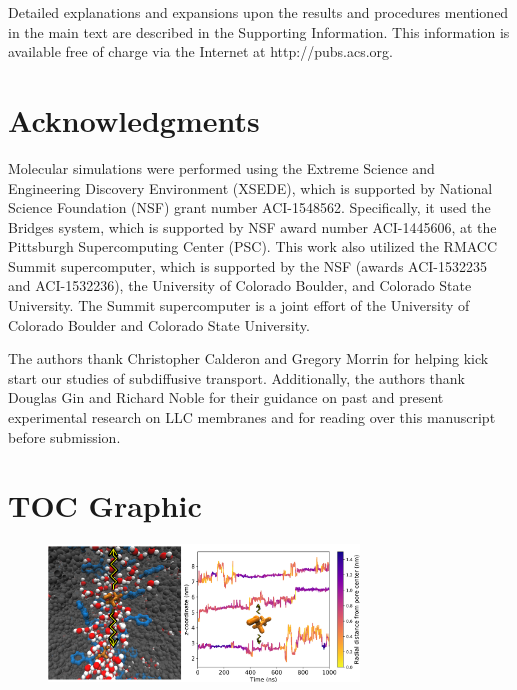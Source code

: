 \documentclass[journal=jpcbfk,manuscript=article]{achemso}
\begin{document}
  Detailed explanations and expansions upon the results and procedures mentioned in
  the main text are described in the Supporting Information. This information is
  available free of charge via the Internet at http://pubs.acs.org.

  \section*{Acknowledgments}

  Molecular simulations were performed using the Extreme Science and
  Engineering Discovery Environment (XSEDE), which is supported by National
  Science Foundation (NSF) grant number ACI-1548562. Specifically, it used the Bridges
  system, which is supported by NSF award number ACI-1445606, at the Pittsburgh
  Supercomputing Center (PSC). This work also utilized the RMACC Summit supercomputer,
  which is supported by the NSF (awards ACI-1532235 and
  ACI-1532236), the University of Colorado Boulder, and Colorado State
  University. The Summit supercomputer is a joint effort of the University of
  Colorado Boulder and Colorado State University.
  
  The authors thank Christopher Calderon and Gregory Morrin for helping kick start
  our studies of subdiffusive transport. Additionally, the authors thank 
  Douglas Gin and Richard Noble for their guidance on past and present experimental
  research on LLC membranes and for reading over this manuscript before submission.

  \clearpage

  
  

  \newpage

  \section*{TOC Graphic}
  
  \begin{figure}[!htb]
  \centering
  \includegraphics[width=3.25in]{toc_transport.pdf}
  \end{figure}
\end{document}
